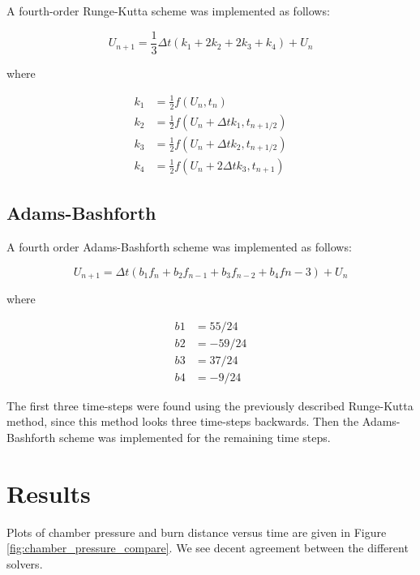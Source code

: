 \documentclass[12pt, letterpaper]{article}
\begin{document}
A fourth-order Runge-Kutta scheme was implemented as follows: 

\begin{equation}
  U_{n+1} = \frac{1}{3} \Delta t \left( k_1 + 2 k_2 + 2 k_3 + k_4 \right) + U_n
\end{equation}

where 

\begin{align*}
  k_1 &= \frac{1}{2} f(U_n, t_n) \\
  k_2 &= \frac{1}{2} f(U_n + \Delta t k_1, t_{n + 1/2}) \\
  k_3 &= \frac{1}{2} f(U_n + \Delta t k_2, t_{n + 1/2}) \\
  k_4 &= \frac{1}{2} f(U_n + 2 \Delta t k_3, t_{n + 1})
\end{align*}

\subsection{Adams-Bashforth}

A fourth order Adams-Bashforth scheme was implemented as follows: 

\begin{equation}
U_{n + 1} = \Delta t \left(b_1 f_n + b_2 f_{n-1} + b_3 f_{n-2} + b_4 f{n-3} \right) + U_n
\end{equation}

where

\begin{align*}
  b1 &= 55/24 \\
  b2 &= -59/24 \\
  b3 &= 37/24 \\
  b4 &= -9/24
\end{align*}

The first three time-steps were found using the previously described Runge-Kutta method, since this method looks three time-steps backwards. Then the Adams-Bashforth scheme was implemented for the remaining time steps. 

\section{Results}

Plots of chamber pressure and burn distance versus time are given in Figure \ref{fig:chamber_pressure_compare}. We see decent agreement between the different solvers. 
\end{document}
